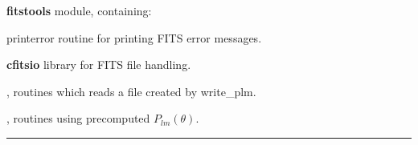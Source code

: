 \begin{modules}
  \begin{sulist}{} %
  \item[\textbf{fitstools}] module, containing:
  \item[printerror] routine for printing FITS error messages.
  \item[\textbf{cfitsio}] library for FITS file handling.		
  \end{sulist}
\end{modules}

\begin{related}
  \begin{sulist}{} %
  \item[\htmlref{read\_dbintab}{sub:read_dbintab}, \htmlref{read\_bintab}{sub:read_bintab}] routines which reads a file created by write\_plm. 
  \item[\htmlref{map2alm}{sub:map2alm}, \htmlref{alm2map}{sub:alm2map}] routines using precomputed $P_{lm}(\theta)$.
  \end{sulist}
\end{related}

\rule{\hsize}{2mm}

\newpage
